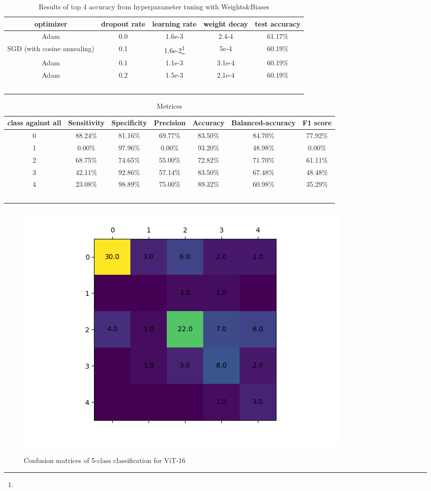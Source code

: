 \documentclass{article}
\begin{document}
\begin{table}
 \caption{Results of top 4 accuracy from hyperparameter tuning with Weights\&Biases}
  \centering
\begin{tabular}{ccccc}
\toprule
optimizer	&dropout rate&	learning rate	&weight decay	&test accuracy\\
\midrule
Adam&	0.0	&1.6e-3	&2.4-4	&61.17\%\\
SGD (with cosine annealing)&	0.1	&1.6e-2\footnote{}	&5e-4	&60.19\%\\
Adam&	0.1	&1.1e-3	&3.1e-4	&60.19\%\\
Adam&	0.2	&1.5e-3	&2.1e-4	&60.19\%\\

   \bottomrule
\
\label{tab:table2}
\end{tabular}
\end{table}

\begin{table}
\centering
\caption{Metrices}
\begin{tabular}{ccccccc}
\toprule
class against all&	Sensitivity	&Specificity	&Precision	&Accuracy	&Balanced-accuracy	&F1 score\\
\midrule
0	&88.24\%	&81.16\%&	69.77\%&	83.50\%&	84.70\%&	77.92\%\\
1	&0.00\%	&97.96\%	&0.00\%	&93.20\%&	48.98\%&	0.00\%\\
2	&68.75\%	&74.65\%	&55.00\%	&72.82\%&	71.70\%&	61.11\%\\
3	&42.11\%	&92.86\%	&57.14\%	&83.50\%&	67.48\%	&48.48\%\\
4	&23.08\%	&98.89\%	&75.00\%	&89.32\%&	60.98\%&	35.29\%\\
   \bottomrule
\
\label{tab:table3}
\end{tabular}
\end{table}



\begin{figure}
\centering
{
\includegraphics[scale=0.53]{../pictures/5-class classification for vit-16.png}
}
\caption{Confusion matrices of 5-class classification for ViT-16}
\label{fig:fig5}
\end{figure}
\end{document}

